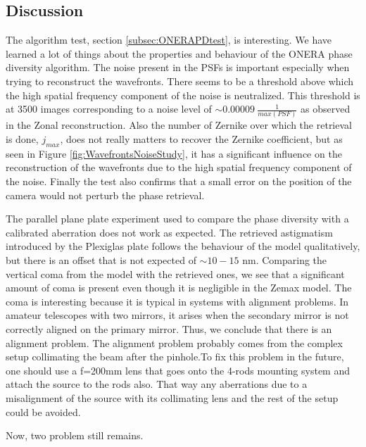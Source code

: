 \subsection{Discussion}
\label{subsec:DiscussionOnera}

The algorithm test, section \ref{subsec:ONERAPDtest}, is interesting. We have learned a lot of things about the properties and behaviour of the ONERA phase diversity algorithm. The noise present in the PSFs is important especially when trying to reconstruct the wavefronts. There seems to be a threshold above which the high spatial frequency component of the noise is neutralized. This threshold is at 3500 images corresponding to a noise level of $\sim0.00009 \ \frac{1}{max(PSF)}$ as observed in the Zonal reconstruction. Also the number of Zernike over which the retrieval is done, $j_{max}$, does not really matters to recover the Zernike coefficient, but as seen in Figure \ref{fig:WavefrontsNoiseStudy}, it has a significant influence on the reconstruction of the wavefronts due to the high spatial frequency component of the noise. Finally the test also confirms that a small error on the position of the camera would not perturb the phase retrieval. 

The parallel plane plate experiment used to compare the phase diversity with a calibrated aberration does not work as expected. The retrieved astigmatism introduced by the Plexiglas plate follows the behaviour of the model qualitatively, but there is an offset that is not expected of $\sim 10-15$ nm. Comparing the vertical coma from the model with the retrieved ones, we see that a significant amount of coma is present even though it is negligible in the Zemax model. The coma is interesting because it is typical in systems with alignment problems. In amateur telescopes with two mirrors, it arises when the secondary mirror is not correctly aligned on the primary mirror. Thus, we conclude that there is an alignment problem. The alignment problem probably comes from the complex setup collimating the beam after the pinhole.To fix this problem in the future, one should use a f=200mm lens that goes onto the 4-rods mounting system and attach the source to the rods also. That way any aberrations due to a misalignment of the source with its collimating lens and the rest of the setup could be avoided.

Now, two problem still remains.

